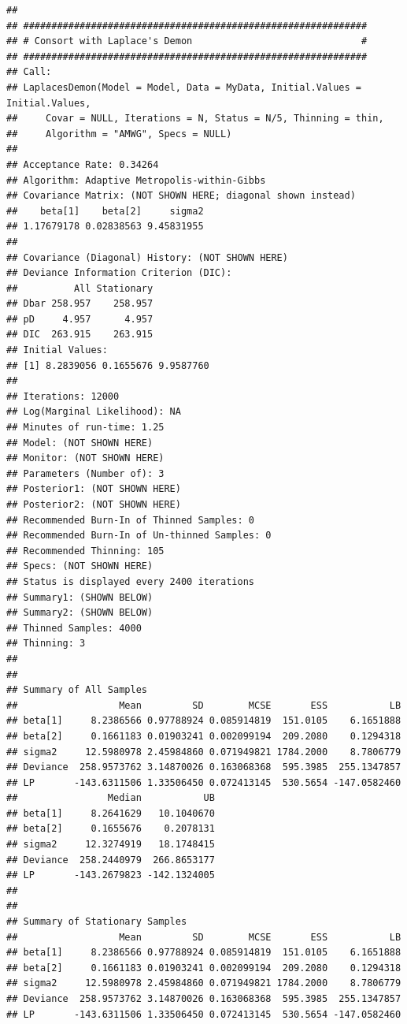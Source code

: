 \documentclass[
]{book}
\begin{document}
\begin{verbatim}
## 
## #############################################################
## # Consort with Laplace's Demon                              #
## #############################################################
## Call:
## LaplacesDemon(Model = Model, Data = MyData, Initial.Values = Initial.Values, 
##     Covar = NULL, Iterations = N, Status = N/5, Thinning = thin, 
##     Algorithm = "AMWG", Specs = NULL)
## 
## Acceptance Rate: 0.34264
## Algorithm: Adaptive Metropolis-within-Gibbs
## Covariance Matrix: (NOT SHOWN HERE; diagonal shown instead)
##    beta[1]    beta[2]     sigma2 
## 1.17679178 0.02838563 9.45831955 
## 
## Covariance (Diagonal) History: (NOT SHOWN HERE)
## Deviance Information Criterion (DIC):
##          All Stationary
## Dbar 258.957    258.957
## pD     4.957      4.957
## DIC  263.915    263.915
## Initial Values:
## [1] 8.2839056 0.1655676 9.9587760
## 
## Iterations: 12000
## Log(Marginal Likelihood): NA
## Minutes of run-time: 1.25
## Model: (NOT SHOWN HERE)
## Monitor: (NOT SHOWN HERE)
## Parameters (Number of): 3
## Posterior1: (NOT SHOWN HERE)
## Posterior2: (NOT SHOWN HERE)
## Recommended Burn-In of Thinned Samples: 0
## Recommended Burn-In of Un-thinned Samples: 0
## Recommended Thinning: 105
## Specs: (NOT SHOWN HERE)
## Status is displayed every 2400 iterations
## Summary1: (SHOWN BELOW)
## Summary2: (SHOWN BELOW)
## Thinned Samples: 4000
## Thinning: 3
## 
## 
## Summary of All Samples
##                  Mean         SD        MCSE       ESS           LB
## beta[1]     8.2386566 0.97788924 0.085914819  151.0105    6.1651888
## beta[2]     0.1661183 0.01903241 0.002099194  209.2080    0.1294318
## sigma2     12.5980978 2.45984860 0.071949821 1784.2000    8.7806779
## Deviance  258.9573762 3.14870026 0.163068368  595.3985  255.1347857
## LP       -143.6311506 1.33506450 0.072413145  530.5654 -147.0582460
##                Median           UB
## beta[1]     8.2641629   10.1040670
## beta[2]     0.1655676    0.2078131
## sigma2     12.3274919   18.1748415
## Deviance  258.2440979  266.8653177
## LP       -143.2679823 -142.1324005
## 
## 
## Summary of Stationary Samples
##                  Mean         SD        MCSE       ESS           LB
## beta[1]     8.2386566 0.97788924 0.085914819  151.0105    6.1651888
## beta[2]     0.1661183 0.01903241 0.002099194  209.2080    0.1294318
## sigma2     12.5980978 2.45984860 0.071949821 1784.2000    8.7806779
## Deviance  258.9573762 3.14870026 0.163068368  595.3985  255.1347857
## LP       -143.6311506 1.33506450 0.072413145  530.5654 -147.0582460

\end{verbatim}
\end{document}
